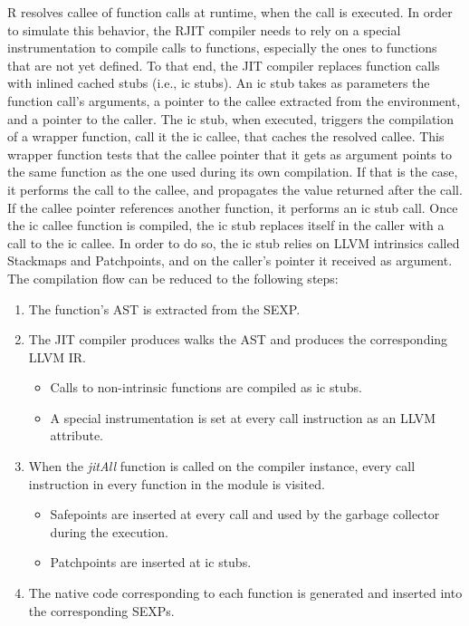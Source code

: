 R resolves callee of function calls at runtime, when the call is executed.
In order to simulate this behavior, the RJIT compiler needs to rely on a special instrumentation to compile calls to functions, especially the ones to functions that are not yet defined.
To that end, the JIT compiler replaces function calls with inlined cached stubs (i.e., ic stubs).
An ic stub takes as parameters the function call's arguments, a pointer to the callee extracted from the environment, and a pointer to the caller.
The ic stub, when executed, triggers the compilation of a wrapper function, call it the ic callee, that caches the resolved callee.
This wrapper function tests that the callee pointer that it gets as argument points to the same function as the one used during its own compilation.
If that is the case, it performs the call to the callee, and propagates the value returned after the call.
If the callee pointer references another function, it performs an ic stub call.
Once the ic callee function is compiled, the ic stub replaces itself in the caller with a call to the ic callee.
In order to do so, the ic stub relies on LLVM intrinsics called Stackmaps\cite{llvmStackMap} and Patchpoints\cite{llvmPatchpoints}, and on the caller's pointer it received as argument.\\

The compilation flow can be reduced to the following steps:
\begin{enumerate}
    \item The function's AST is extracted from the SEXP.
    \item The JIT compiler produces walks the AST and produces the corresponding LLVM IR.
        \begin{itemize}
        \item Calls to non-intrinsic functions are compiled as ic stubs.
        \item A special instrumentation is set at every call instruction as an LLVM attribute\cite{llvmAttribute}.
        \end{itemize}
    \item When the \textit{jitAll} function is called on the compiler instance, every call instruction in every function in the module is visited.\label{jitAll}
        \begin{itemize}
        \item Safepoints are inserted at every call and used by the garbage collector during the execution.
        \item Patchpoints\cite{llvmPatchpoints} are inserted at ic stubs.
        \end{itemize}
    \item The native code corresponding to each function is generated and inserted into the corresponding SEXPs.
\end{enumerate}

